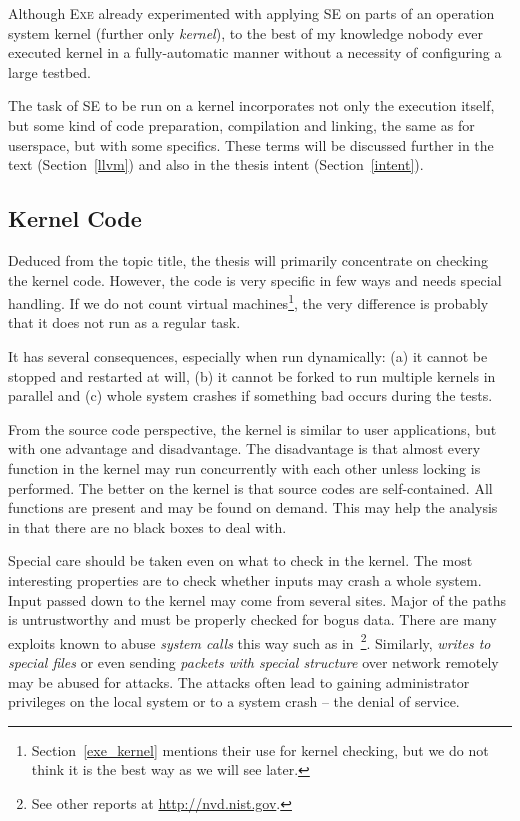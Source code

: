 \documentclass[11pt,a4paper]{article}
\begin{document}
Although \textsc{Exe} already experimented with applying SE on parts of an
operation system kernel (further only \emph{kernel}), to the best of my
knowledge nobody ever executed kernel in a fully-automatic manner without a
necessity of configuring a large testbed.

The task of SE to be run on a kernel incorporates not only the execution
itself, but some kind of code preparation, compilation and linking, the same
as for userspace, but with some specifics. These terms will be discussed
further in the text (Section~\ref{llvm}) and also in the thesis intent
(Section~\ref{intent}).

\subsection{Kernel Code}
Deduced from the topic title, the thesis will primarily concentrate on
checking the kernel code. However, the code is very specific in few ways and
needs special handling. If we do not count virtual
machines\footnote{Section~\ref{exe_kernel} mentions their use for kernel
checking, but we do not think it is the best way as we will see later.}, the
very difference is probably that it does not run as a regular task.

It has several consequences, especially when run dynamically: (a) it cannot be
stopped and restarted at will, (b) it cannot be forked to run multiple kernels
in parallel and (c) whole system crashes if something bad occurs during the
tests.

From the source code perspective, the kernel is similar to user applications,
but with one advantage and disadvantage. The disadvantage is that almost every
function in the kernel may run concurrently with each other unless locking is
performed. The better on the kernel is that source codes are self-contained.
All functions are present and may be found on demand. This may help the
analysis in that there are no black boxes to deal with.

Special care should be taken even on what to check in the kernel. The most
interesting properties are to check whether inputs may crash a whole system.
Input passed down to the kernel may come from several sites. Major of the
paths is untrustworthy and must be properly checked for bogus data. There are
many exploits known to abuse \emph{system calls} this way such as
in~\cite{exploit_vmsplice,exploit_proto_ops,exploit_tun}\footnote{See other
reports at \url{http://nvd.nist.gov}.}. Similarly, \emph{writes to special
files} or even sending \emph{packets with special structure} over network
remotely may be abused for attacks. The attacks often lead to gaining
administrator privileges on the local system or to a system crash -- the
denial of service.
\end{document}
